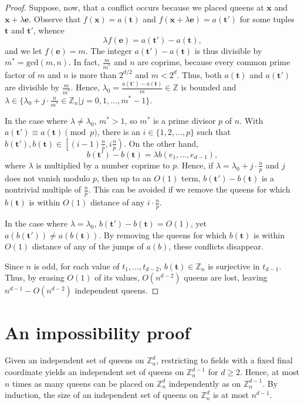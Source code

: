 \documentclass[11pt]{article}
\begin{document}
\begin{proof}
Suppose, now, that a conflict occurs because we placed queens at $\mathbf{x}$ and $\mathbf{x}+\lambda \mathbf{e}$. Observe that $f(\mathbf{x})=a(\mathbf{t})$ and $f(\mathbf{x}+\lambda \mathbf{e})=a(\mathbf{t'})$ for some tuples $\mathbf{t}$ and $\mathbf{t}'$, whence
$$\lambda f(\mathbf{e})=a(\mathbf{t'})-a(\mathbf{t}),$$
and we let $f(\mathbf{e})=m$. The integer $a(\mathbf{t}')-a(\mathbf{t})$ is thus divisible by $m^*=\text{gcd}(m,n)$. In fact, $\frac{m}{m^*}$ and $n$ are coprime, because every common prime factor of $m$ and $n$ is more than $2^{d/2}$ and $m<2^d$. Thus, both $a(\mathbf{t})$ and $a(\mathbf{t}')$ are divisible by $\frac{m}{m^*}$. Hence, $\lambda_0=\frac{a(\mathbf{t}')-a(\mathbf{t})}{m}\in \mathbb{Z}$ is bounded and $\lambda \in\{\lambda_0+j\cdot \frac{n}{m^*}\in \mathbb{Z}_n|j=0,1,\ldots,m^*-1\}$.

In the case where $\lambda\neq \lambda_0$, $m^*>1$, so $m^*$ is a prime divisor $p$ of $n$. With $a(\mathbf{t}')\equiv a(\mathbf{t})\pmod p$, there is an $i\in \{1,2,\dots,p\}$ such that $b(\mathbf{t'}),b(\mathbf{t})\in\left[(i-1)\frac np,i\frac np\right)$. On the other hand, 
$$b(\mathbf{t'})-b(\mathbf{t})=\lambda b(e_1,\dots,e_{d-1}),$$
where $\lambda$ is multiplied by a number coprime to $p$. Hence, if $\lambda=\lambda_0+j\cdot \frac{n}{p}$ and $j$ does not vanish modulo $p$, then up to an $O(1)$ term, $b(\mathbf{t'})-b(\mathbf{t})$ is a nontrivial multiple of $\frac np$. This can be avoided if we remove the queens for which $b(\mathbf{t})$ is within $O(1)$ distance of any $i\cdot \frac np$.

In the case where $\lambda =\lambda_0$, $b(\mathbf{t'})-b(\mathbf{t})=O(1)$, yet $a(b(\mathbf{t}'))\neq a(b(\mathbf{t}))$. By removing the queens for which $b(\mathbf{t})$ is within $O(1)$ distance of any of the jumps of $a(b)$, these conflicts disappear.

Since $n$ is odd, for each value of $t_1,\ldots,t_{d-2}$, $b(\mathbf{t})\in \mathbb{Z}_n$ is surjective in $t_{d-1}$. Thus, by erasing $O(1)$ of its values, $O(n^{d-2})$ queens are lost, leaving $n^{d-1}-O(n^{d-2})$ independent queens.
\end{proof}

\section{An impossibility proof}

Given an independent set of queens on $\mathbb{Z}_n^d$, restricting to fields with a fixed final coordinate yields an independent set of queens on $\mathbb{Z}_n^{d-1}$ for $d\ge 2$. Hence, at most $n$ times as many queens can be placed on $\mathbb{Z}_n^d$ independently as on $\mathbb{Z}_n^{d-1}$. By induction, the size of an independent set of queens on $\mathbb{Z}_n^d$ is at most $n^{d-1}$.
\end{document}
